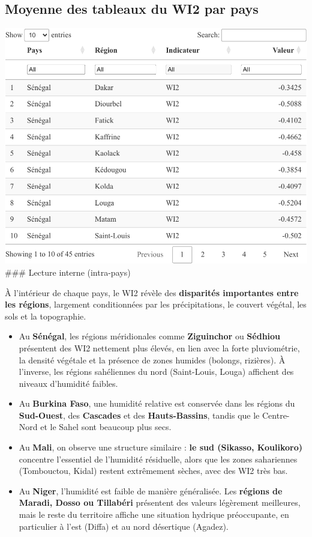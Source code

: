 \documentclass[
]{book}
\begin{document}
\subsection{Moyenne des tableaux du WI2 par pays}\label{moyenne-des-tableaux-du-wi2-par-pays}

\includegraphics{Atlas-Spectral-Sahel_files/figure-latex/wi2-table-1.pdf}
\#\#\# Lecture interne (intra-pays)

À l'intérieur de chaque pays, le WI2 révèle des \textbf{disparités importantes entre les régions}, largement conditionnées par les précipitations, le couvert végétal, les sols et la topographie.

\begin{itemize}
\item
  Au \textbf{Sénégal}, les régions méridionales comme \textbf{Ziguinchor} ou \textbf{Sédhiou} présentent des WI2 nettement plus élevés, en lien avec la forte pluviométrie, la densité végétale et la présence de zones humides (bolongs, rizières). À l'inverse, les régions sahéliennes du nord (Saint-Louis, Louga) affichent des niveaux d'humidité faibles.
\item
  Au \textbf{Burkina Faso}, une humidité relative est conservée dans les régions du \textbf{Sud-Ouest}, des \textbf{Cascades} et des \textbf{Hauts-Bassins}, tandis que le Centre-Nord et le Sahel sont beaucoup plus secs.
\item
  Au \textbf{Mali}, on observe une structure similaire : \textbf{le sud (Sikasso, Koulikoro)} concentre l'essentiel de l'humidité résiduelle, alors que les zones sahariennes (Tombouctou, Kidal) restent extrêmement sèches, avec des WI2 très bas.
\item
  Au \textbf{Niger}, l'humidité est faible de manière généralisée. Les \textbf{régions de Maradi, Dosso ou Tillabéri} présentent des valeurs légèrement meilleures, mais le reste du territoire affiche une situation hydrique préoccupante, en particulier à l'est (Diffa) et au nord désertique (Agadez).
\end{itemize}
\end{document}

